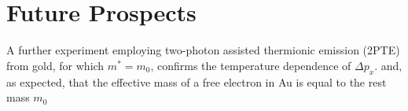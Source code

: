 \section{Future Prospects} \label{sec:photocathode_future}

A further experiment employing two-photon assisted thermionic emission (2PTE) from gold, for which $m^* = m_0$\cite{johnson_optical_1972}, confirms the temperature dependence of $\Delta p_x$.
 and, as expected, that the effective mass of a free electron in Au is equal to the rest mass $m_0$\cite{johnson_optical_1972}
